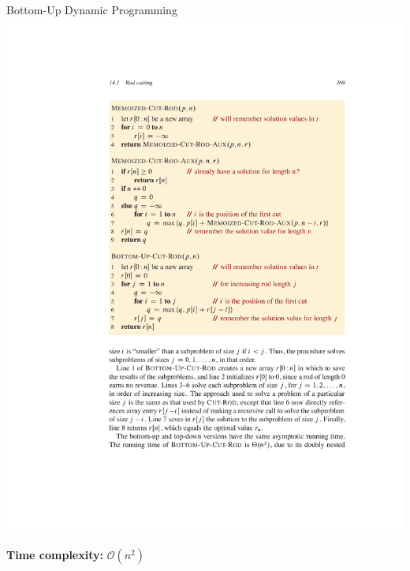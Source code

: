 \documentclass{beamer}
\begin{document}
\begin{frame}{Bottom-Up Dynamic Programming}
    \centering
    \includegraphics[width=\textwidth,clip=true,trim=5cm 10.5cm 3cm 12.5cm]{figures/p369}

    \textbf{Time complexity:} $\mathcal{O}(n^2)$
\end{frame}
\end{document}
